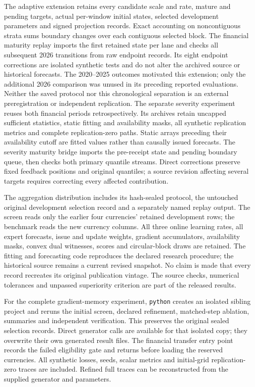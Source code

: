 \documentclass[11pt,a4paper]{article}
\theoremstyle{definition}\newtheorem{definition}[theorem]{Definition}
\begin{document}
The adaptive extension retains every candidate scale and rate, mature and pending targets, actual per-window initial states, selected development parameters and signed projection records. Exact accounting on noncontiguous strata sums boundary changes over each contiguous selected block. The financial maturity replay imports the first retained state per lane and checks all subsequent 2026 transitions from raw endpoint records. Its eight endpoint corrections are isolated synthetic tests and do not alter the archived source or historical forecasts. The 2020--2025 outcomes motivated this extension; only the additional 2026 comparison was unused in its preceding reported evaluations. Neither the saved protocol nor this chronological separation is an external preregistration or independent replication. The separate severity experiment reuses both financial periods retrospectively. Its archives retain uncapped sufficient statistics, static fitting and availability masks, all synthetic replication metrics and complete replication-zero paths. Static arrays preceding their availability cutoff are fitted values rather than causally issued forecasts. The severity maturity bridge imports the pre-receipt state and pending boundary queue, then checks both primary quantile streams. Direct corrections preserve fixed feedback positions and original quantiles; a source revision affecting several targets requires correcting every affected contribution.

The aggregation distribution includes its hash-sealed protocol, the untouched original development selection record and a separately named replay output. The screen reads only the earlier four currencies' retained development rows; the benchmark reads the new currency columns. All three online learning rates, all expert forecasts, issue and update weights, gradient accumulators, availability masks, convex dual witnesses, scores and circular-block draws are retained. The fitting and forecasting code reproduces the declared research procedure; the historical source remains a current revised snapshot. No claim is made that every record recreates its original publication vintage. The source checks, numerical tolerances and unpassed superiority criterion are part of the released results.


For the complete gradient-memory experiment, \texttt{python}  creates an isolated sibling project and reruns the initial screen, declared refinement, matched-step ablation, summaries and independent verification. This preserves the original sealed selection records. Direct generator calls are available for that isolated copy; they overwrite their own generated result files. The financial transfer entry point records the failed eligibility gate and returns before loading the reserved currencies. All synthetic losses, seeds, scalar metrics and initial-grid replication-zero traces are included. Refined full traces can be reconstructed from the supplied generator and parameters.
\end{document}
